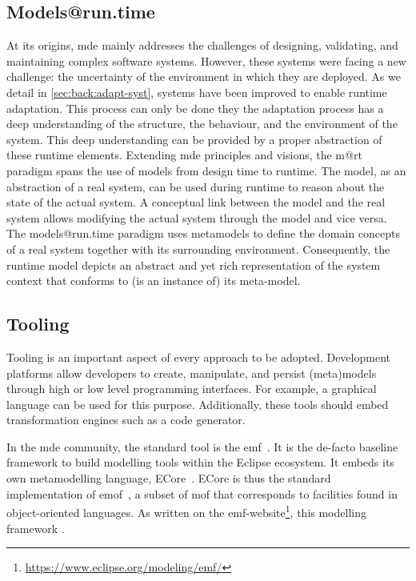 \subsection{Models@run.time}
At its origins, \gls{mde} mainly addresses the challenges of designing, validating, and maintaining complex software systems.
However, these systems were facing a new challenge: the uncertainty of the environment in which they are deployed.
As we detail in \autoref{sec:back:adapt-syst}, systems have been improved to enable runtime adaptation.
This process can only be done they the adaptation process has a deep understanding of the structure, the behaviour, and the environment of the system.
This deep understanding can be provided by a proper abstraction of these runtime elements.
Extending \gls{mde} principles and visions, the \gls{m@rt} paradigm spans the use of \glspl{model} from design time to runtime.
The model, as an abstraction of a real system, can be used during runtime to reason about the state of the actual system. 
A conceptual link between the model and the real system allows modifying the actual system through the model and vice versa.
The models@run.time paradigm uses \glspl{metamodel} to define the domain concepts of a real system together with its surrounding environment. 
Consequently, the runtime model depicts an abstract and yet rich representation of the system context that conforms to (is an instance of) its meta-model.

\subsection{Tooling}
Tooling is an important aspect of every approach to be adopted.
Development platforms allow developers to create, manipulate, and persist (meta)\glspl{model} through high or low level programming interfaces.
For example, a graphical language can be used for this purpose.
Additionally, these tools should embed transformation engines such as a code generator.

In the \gls{mde} community, the standard tool is the \gls{emf}~\cite{steinberg2008emf}.
It is the de-facto baseline framework to build modelling tools within the Eclipse ecosystem.
It embeds its own metamodelling  language, ECore~\cite{steinberg2008emf, ECore:website}.
ECore is thus the standard implementation of \gls{emof}~\cite{MOF:Spec}, a subset of \gls{mof} that corresponds to facilities found in object-oriented languages.
As written on the \gls{emf}-website\footnote{\url{https://www.eclipse.org/modeling/emf/}}, this modelling framework . 

